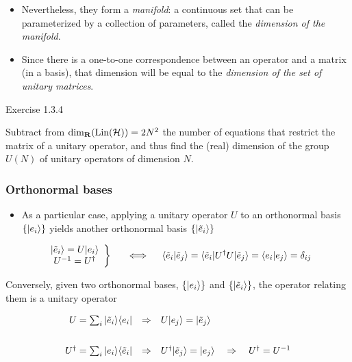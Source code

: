 \documentclass[11pt]{article}
\providecommand{\tightlist}{%
      \setlength{\itemsep}{0pt}\setlength{\parskip}{0pt}}
\begin{document}
    \begin{itemize}
\tightlist
\item
  Nevertheless, they form a \emph{manifold}: a continuous set that can
  be parameterized by a collection of parameters, called the
  \emph{dimension of the manifold}.
\end{itemize}

    \begin{itemize}
\tightlist
\item
  Since there is a one-to-one correspondence between an operator and a
  matrix (in a basis), that dimension will be equal to the
  \emph{dimension of the set of unitary matrices}.
\end{itemize}

    Exercise 1.3.4

Subtract from \({\rm dim}_{\bf R}(\hbox{Lin}({\cal H})) = 2N^2\) the number of
equations that restrict the matrix of a unitary operator, and thus find
the (real) dimension of the group \(U(N)\) of unitary operators of
dimension \(N\).

    \subsubsection{Orthonormal bases}\label{orthonormal-bases}

\begin{itemize}
\tightlist
\item
  As a particular case, applying a unitary operator \(U\) to an
  orthonormal basis \(\{|e_i\rangle\}\) yields another orthonormal basis
  \(\{|\tilde e_i\rangle\}\)
\end{itemize}

\[
\left. \begin{array}{c}\ket{\tilde e_i} = U\ket{e_i}\\ U^{-1} =  U^\dagger \end{array} \right\}
~~~~ \Longleftrightarrow ~~~~\braket{\tilde e_i}{\tilde e_j} = \bra{\tilde e_i}U^\dagger U\ket{\tilde e_j} = \braket{e_i}{e_j} = \delta_{ij}
\]

    Conversely, given two orthonormal bases, \(\{|e_i\rangle\}\) and
\(\{|\tilde e_i\rangle\}\), the operator relating them is a unitary
operator

\[ 
 \begin{array}{rcl} 
U = \sum_i \ketbra{\tilde e_i}{e_i} & \Rightarrow &  U\ket{e_j} = \ket{\tilde e_j} 
 \\ \rule{0mm}{10mm}
U^\dagger = \sum_i \ketbra{e_i}{\tilde e_i}  & \Rightarrow &    U^\dagger\ket{\tilde e_j} = \ket{e_j} ~~~\Rightarrow ~~~U^\dagger = U^{-1}
 \end{array}
\]
\end{document}
